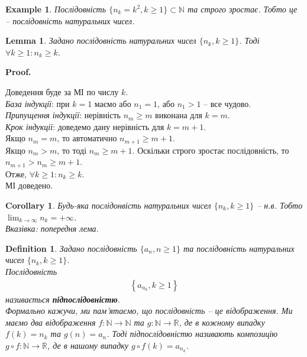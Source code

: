 \documentclass[a4paper, 14pt]{article}
\makeatletter
\def\qed{$\blacksquare$}
\theoremstyle{theoremdd}
\theoremstyle{theoremdd}
\newtheorem{definition}[theorem]{Definition}
\theoremstyle{theoremdd}
\theoremstyle{theoremdd}
\newtheorem{example}[theorem]{Example}
\theoremstyle{theoremdd}
\theoremstyle{theoremdd}
\theoremstyle{theoremdd}
\newtheorem{lemma}[theorem]{Lemma}
\theoremstyle{theoremdd}
\newtheorem{corollary}[theorem]{Corollary}
\renewenvironment{proof}[1][Proof.\\]{\par
\pushQED{\hfill \qed}%
\normalfont \topsep6\p@\@plus6\p@\relax
\trivlist
\item\relax
{\bfseries
#1\@addpunct{.}}\hspace\labelsep\ignorespaces
}{%
\popQED\endtrivlist\@endpefalse
}
\makeatother
\begin{document}
	\begin{example}
	Послідовність $\{n_k = k^2, k \geq 1\} \subset \mathbb{N}$ та строго зростає. Тобто це -- послідовність натуральних чисел.
	\end{example}
	
	\begin{lemma}
	Задано послідовність натуральних чисел $\{n_k, k \geq 1\}$. Тоді $\forall k \geq 1: n_k \geq k$.
	\end{lemma}
	
	\begin{proof}
	Доведення буде за МІ по числу $k$.\\
	\textit{База індукції}: при $k = 1$ маємо або $n_1 = 1$, або $n_1 > 1$ -- все чудово.\\
	\textit{Припущення індукції}: нерівність $n_m \geq m$ виконана для $k=m$.\\
	\textit{Крок індукції}: доведемо дану нерівність для $k=m+1$.\\
	Якщо $n_m = m$, то автоматично $n_{m+1} \geq m+1$.\\
	Якщо $n_m > m$, то тоді $n_m \geq m+1$. Оскільки строго зростає послідовність, то $n_{m+1} > n_m \geq m+1$.\\
	Отже, $\forall k \geq 1: n_k \geq k$. \\
	МІ доведено.
	\end{proof}
	
	\begin{corollary}
	Будь-яка послідонвість натуральних чисел $\{n_k, k \geq 1\}$ -- н.в. Тобто $\displaystyle\lim_{k \to \infty} n_k = +\infty$.\\
	\textit{Вказівка: попередня лема.}
	\end{corollary}
	
	\begin{definition}
	Задано послідовність $\{a_n, n \geq 1\}$ та послідовність натуральних чисел $\{n_k, k \geq 1\}$.\\
	Послідовність
	\begin{align*}
	\left\{a_{n_k}, k \geq 1\right\}
	\end{align*}
	називається \textbf{підпослідовністю}.\\
	Формально кажучи, ми пам'ятаємо, що послідовність -- це відображення. Ми маємо два відображення $f \colon \mathbb{N} \to \mathbb{N}$ та $g \colon \mathbb{N} \to \mathbb{R}$, де в кожному випадку $f(k) = n_k$ та $g(n) = a_n$. Тоді підпослідовністю називають композицію $g \circ f \colon \mathbb{N} \to \mathbb{R}$, де в нашому випадку $g \circ f (k) = a_{n_k}$.
	\end{definition}
	
\end{document}
